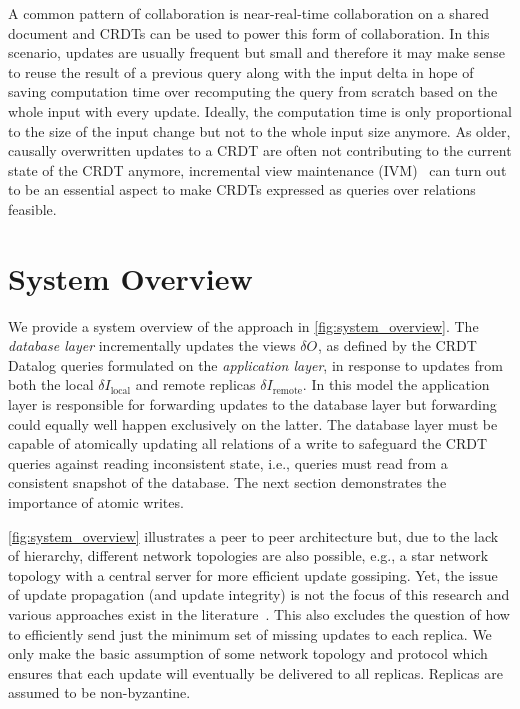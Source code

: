 \documentclass{article}
\newcommand{\deltaI}[1]{\(\delta I_{\text{#1}}\)}
\newcommand{\deltaO}[1][]{\(\delta O_{\text{#1}}\)}
\begin{document}
A common pattern of collaboration is near-real-time collaboration on a shared
document and CRDTs can be used to power this form of collaboration.
In this scenario, updates are usually frequent but small and therefore it
may make sense to reuse the result of a previous query along with the input
delta in hope of saving computation time over recomputing the query from scratch
based on the whole input with every update.
Ideally, the computation time is only proportional to the size of the input
change but not to the whole input size anymore.
As older, causally overwritten updates to a CRDT are often not contributing
to the current state of the CRDT anymore, incremental view
maintenance (IVM)~\cite{mcsherry2013differential, budiu2022dbsp, budiu2024dbsp}
can turn out to be an essential aspect to make CRDTs expressed as
queries over relations feasible.

\section{System Overview}
\label{sec:system_overview}

We provide a system overview of the approach in \autoref{fig:system_overview}.
The \emph{database layer} incrementally updates the views \deltaO{},
as defined by the CRDT Datalog queries formulated on the \emph{application layer},
in response to updates from both the local \deltaI{local} and remote replicas
\deltaI{remote}.
In this model the application layer is responsible for forwarding updates
to the database layer but forwarding could equally well happen exclusively
on the latter.
The database layer must be capable of atomically updating all relations
of a write to safeguard the CRDT queries against reading inconsistent
state, i.e., queries must read from a consistent snapshot of the database.
The next section demonstrates the importance of atomic writes.

\autoref{fig:system_overview} illustrates a peer to peer architecture
but, due to the lack of hierarchy, different network topologies are also possible,
e.g., a star network topology with a central server for more efficient update
gossiping.
Yet, the issue of update propagation (and update integrity) is not the focus
of this research and various approaches exist in the literature~\cite{
	auvolat2019merkle, sanjuan2020merkle, kleppmann2024bluesky,
	kleppmann2022making}.
This also excludes the question of how to efficiently send just the minimum
set of missing updates to each replica.
We only make the basic assumption of some network topology and protocol
which ensures that each update will eventually be delivered to all replicas.
Replicas are assumed to be non-byzantine.
\end{document}
